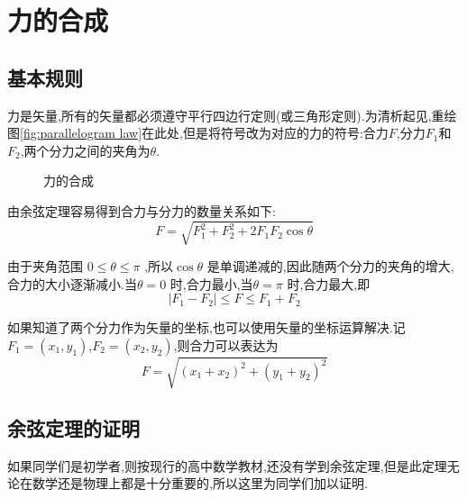 \section{力的合成}
\subsection{基本规则}

力是矢量,所有的矢量都必须遵守平行四边行定则(或三角形定则).为清析起见,重绘图\ref{fig:parallelogram law}在此处,但是将符号改为对应的力的符号:合力$F$,分力$F_1$和$F_2$,两个分力之间的夹角为$\theta$.

\begin{figure}[H]
  \centering
  \caption{力的合成}
\end{figure}

由余弦定理容易得到合力与分力的数量关系如下:
\begin{equation}
  F=\sqrt{F_1^2+F_2^2+2F_1F_2\cos\theta}
  \label{eq:cosine law}
\end{equation}

由于夹角范围 $0\leqslant \theta \leqslant \pi$ ,所以$\cos\theta$ 是单调递减的,因此随两个分力的夹角的增大,合力的大小逐渐减小.当$\theta=0$ 时,合力最小,当$\theta=\pi$ 时,合力最大,即
\begin{equation}
  |F_1-F_2|\leqslant F \leqslant F_1+F_2
  \label{eq:resultant force}
\end{equation}

如果知道了两个分力作为矢量的坐标,也可以使用矢量的坐标运算解决.记$F_1=(x_1,y_1)$,$F_2=(x_2,y_2)$,则合力可以表达为
\begin{equation}
  F=\sqrt{(x_1+x_2)^2+(y_1+y_2)^2}
  \label{eq:coordinate force}
\end{equation}
\subsection{余弦定理的证明}
如果同学们是初学者,则按现行的高中数学教材,还没有学到余弦定理,但是此定理无论在数学还是物理上都是十分重要的,所以这里为同学们加以证明.

